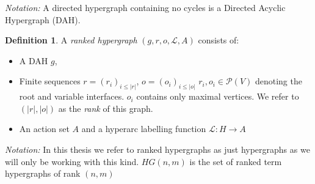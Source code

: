 \documentclass[12pt]{article}
\theoremstyle{definition}
\newtheorem{definition}[theorem]{Definition}
\renewcommand{\P}{\mathcal{P}}
\newcommand{\1}{\mathbbm{1}}
\renewcommand{\L}{\mathcal{L}}
\begin{document}
\emph{Notation:} A directed hypergraph containing no cycles is a Directed Acyclic Hypergraph (DAH).

\begin{definition}
A \emph{ranked hypergraph} $(g, r, o, \L, A)$ consists of:
\begin{itemize}
\item A DAH $g$,
\item Finite sequences $r = (r_i)_{i\leq |r|}$, $o = (o_i)_{i\leq |o|}$ $r_i, o_i\in \P(V)$ denoting the root and variable interfaces. $o_i$ contains only maximal vertices. We refer to $(|r|, |o|)$ as the \emph{rank} of this graph.
\item An action set $A$ and a hyperarc labelling function $\L: H\to A$
\end{itemize}
\end{definition}
\emph{Notation:} In this thesis we refer to ranked hypergraphs as just hypergraphs as we will only be working with this kind. $HG(n,m)$ is the set of ranked term  hypergraphs of rank $(n,m)$
\end{document}
